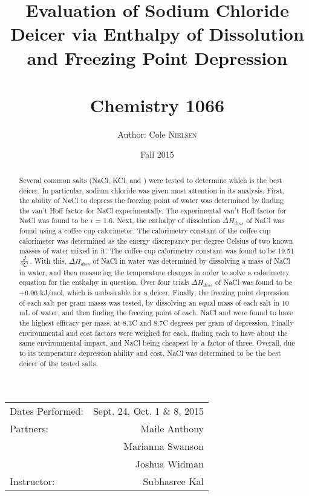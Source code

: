 \documentclass[12pt, letterpaper]{article}
\title{Evaluation of Sodium Chloride \\ Deicer via Enthalpy of Dissolution \\ and Freezing Point Depression \\ \adforn{21} \\  Chemistry 1066} %
\author{Author: Cole \textsc{Nielsen}} %
\date{Fall 2015} %
\begin{document}
\maketitle %

\begin{center}
 \begin{tabular}{l r}
  Dates Performed: & Sept. 24, Oct. 1 \& 8, 2015 \\ %
  Partners: & Maile Anthony \\ 
  & Marianna Swanson \\ 
  &Joshua Widman \\ %
  Instructor: & Subhasree Kal %
 \end{tabular}
\end{center}

\pagebreak
\begin{abstract}\doublespacing
\noindent	Several common salts (NaCl, KCl,  and ) were tested to determine which is the best deicer. In particular, sodium chloride was given most attention in its analysis. First, the ability of NaCl to depress the freezing point of water was determined by finding the van't Hoff factor for NaCl experimentally. The experimental van't Hoff factor for NaCl was found to be $i$ = 1.6. Next, the enthalpy of dissolution $\Delta H_{diss}$ of NaCl was found using a coffee cup calorimeter. The calorimetry constant of the coffee cup calorimeter was determined as the energy discrepancy per degree Celsius of two known masses of water mixed in it. The coffee cup calorimetry constant was found to be 19.51 $\frac{J}{\textnormal{\textdegree} C}$. With this, $\Delta H_{diss}$ of NaCl in water was determined by dissolving a mass of NaCl in water, and then measuring the temperature changes in order to solve a calorimetry equation for the enthalpy in question. Over four trials $\Delta H_{diss}$ of NaCl was found to be +6.06 kJ/mol, which is undesirable for a deicer. Finally, the freezing point depression of each salt per gram masss was tested, by dissolving an equal mass of each salt in 10 mL of water, and then finding the freezing point of each. NaCl and  were found to have the highest efficacy per mass, at 8.3\space\textdegree C and 8.7\space\textdegree C degrees per gram of depression. Finally environmental and cost factors were weighed for each, finding each to have about the same environmental impact, and NaCl being cheapest by a factor of three. Overall, due to its temperature depression ability and cost, NaCl was determined to be the best deicer of the tested salts.
\end{abstract}
\hrulefill
\end{document}
